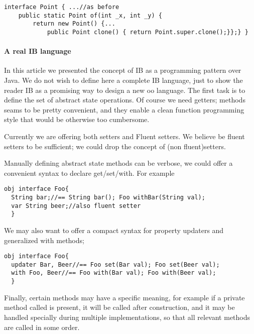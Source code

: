 \begin{lstlisting}
interface Point { ...//as before
    public static Point of(int _x, int _y) {
        return new Point() {...
            public Point clone() { return Point.super.clone();}};} }
\end{lstlisting} 

\paragraph{A real IB language}
In this article we presented the concept of IB as a programming pattern over Java.
We do not wish to define here a complete IB language, just to show the reader IB as
a promising way to design a new oo language.
The first task is to define the set of abstract state operations.
Of course we need getters; \Q@withX@ methods seams to be pretty convenient, and they enable a
clean function programming style that would be otherwise too cumbersome.

Currently we are offering both setters and Fluent setters.
We believe be fluent setters to be sufficient; we could drop the concept of (non fluent)setters.

Manually defining abstract state methods can be verbose, we could offer a convenient syntax to 
declare get/set/with.
For example
\begin{lstlisting}
obj interface Foo{
  String bar;//== String bar(); Foo withBar(String val);
  var String beer;//also fluent setter
  }
\end{lstlisting}

We may also want to offer a compact syntax for property updaters and generalized with methods;
\begin{lstlisting}
obj interface Foo{
  updater Bar, Beer//== Foo set(Bar val); Foo set(Beer val);
  with Foo, Beer//== Foo with(Bar val); Foo with(Beer val);
  }
\end{lstlisting}
Finally, certain methods may have a specific meaning, for example
if a private method called \Q@init@ is present, it will be called after construction,
and it may be handled specially during multiple implementations, so that all relevant \Q@init@ methods are
called in some order.
